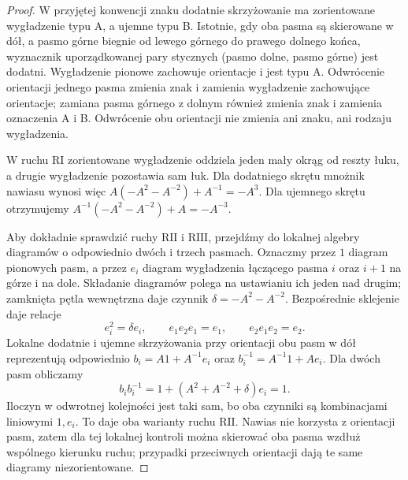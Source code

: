 \begin{proof}
W przyjętej konwencji znaku dodatnie skrzyżowanie
ma zorientowane wygładzenie typu A, a ujemne typu B.
Istotnie, gdy oba pasma są skierowane w dół, a pasmo
górne biegnie od lewego górnego do prawego dolnego
końca, wyznacznik uporządkowanej pary stycznych
(pasmo dolne, pasmo górne) jest dodatni.
Wygładzenie pionowe zachowuje orientacje i jest typu A.
Odwrócenie orientacji jednego pasma zmienia znak
i zamienia wygładzenie zachowujące orientacje;
zamiana pasma górnego z dolnym również zmienia znak
i zamienia oznaczenia A i B. Odwrócenie obu orientacji
nie zmienia ani znaku, ani rodzaju wygładzenia.

W ruchu $\mathrm{R I}$ zorientowane wygładzenie
oddziela jeden mały okrąg od reszty łuku, a drugie
wygładzenie pozostawia sam łuk. Dla dodatniego skrętu
mnożnik nawiasu wynosi więc
$A(-A^2-A^{-2})+A^{-1}=-A^3$.
Dla ujemnego skrętu otrzymujemy
$A^{-1}(-A^2-A^{-2})+A=-A^{-3}$.

Aby dokładnie sprawdzić ruchy $\mathrm{R II}$ i
$\mathrm{R III}$, przejdźmy do lokalnej algebry
diagramów o odpowiednio dwóch i trzech pasmach.
Oznaczmy przez $1$ diagram pionowych pasm,
a przez $e_i$ diagram wygładzenia łączącego
pasma $i$ oraz $i+1$ na górze i na dole.
Składanie diagramów polega na ustawianiu ich
jeden nad drugim; zamknięta pętla wewnętrzna
daje czynnik $\delta=-A^2-A^{-2}$.
Bezpośrednie sklejenie daje relacje
\[
e_i^2=\delta e_i,\qquad
e_1e_2e_1=e_1,\qquad
e_2e_1e_2=e_2.
\]
Lokalne dodatnie i ujemne skrzyżowania
przy orientacji obu pasm w dół reprezentują odpowiednio
$b_i=A1+A^{-1}e_i$ oraz
$b_i^{-1}=A^{-1}1+Ae_i$.
Dla dwóch pasm obliczamy
\[
b_ib_i^{-1}
=1+(A^2+A^{-2}+\delta)e_i=1.
\]
Iloczyn w odwrotnej kolejności jest taki sam,
bo oba czynniki są kombinacjami liniowymi $1,e_i$.
To daje oba warianty ruchu $\mathrm{R II}$. Nawias
nie korzysta z orientacji pasm, zatem dla tej
lokalnej kontroli można skierować oba pasma wzdłuż
wspólnego kierunku ruchu; przypadki przeciwnych
orientacji dają te same diagramy niezorientowane.


\end{proof}
